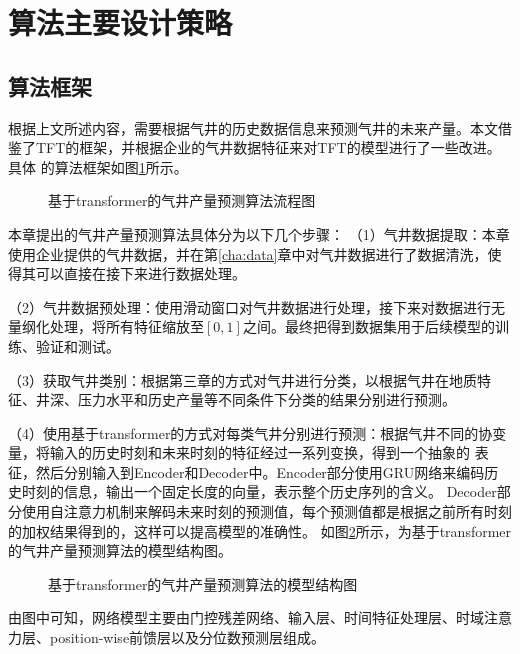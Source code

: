 \section{算法主要设计策略}
\subsection{算法框架}
根据上文所述内容，需要根据气井的历史数据信息来预测气井的未来产量。本文借鉴了TFT的框架，并根据企业的气井数据特征来对TFT的模型进行了一些改进。具体
的算法框架如图\ref{fig:TFTprogess}所示。
\begin{figure}[H]
    \label{fig:TFTprogess}
    \caption{基于transformer的气井产量预测算法流程图}
\end{figure}
本章提出的气井产量预测算法具体分为以下几个步骤：
（1）气井数据提取：本章使用企业提供的气井数据，并在第\ref{cha:data}章中对气井数据进行了数据清洗，使得其可以直接在接下来进行数据处理。

（2）气井数据预处理：使用滑动窗口对气井数据进行处理，接下来对数据进行无量纲化处理，将所有特征缩放至$[0,1]$之间。最终把得到数据集用于后续模型的训练、验证和测试。

（3）获取气井类别：根据第三章的方式对气井进行分类，以根据气井在地质特征、井深、压力水平和历史产量等不同条件下分类的结果分别进行预测。

（4）使用基于transformer的方式对每类气井分别进行预测：根据气井不同的协变量，将输入的历史时刻和未来时刻的特征经过一系列变换，得到一个抽象的
表征，然后分别输入到Encoder和Decoder中。Encoder部分使用GRU网络来编码历史时刻的信息，输出一个固定长度的向量，表示整个历史序列的含义。
Decoder部分使用自注意力机制来解码未来时刻的预测值，每个预测值都是根据之前所有时刻的加权结果得到的，这样可以提高模型的准确性。
如图\ref{fig:TFT}所示，为基于transformer的气井产量预测算法的模型结构图。
\begin{figure}
    \label{fig:TFT}
    \caption{基于transformer的气井产量预测算法的模型结构图}
\end{figure}
由图中可知，网络模型主要由门控残差网络、输入层、时间特征处理层、时域注意力层、position-wise前馈层以及分位数预测层组成。
